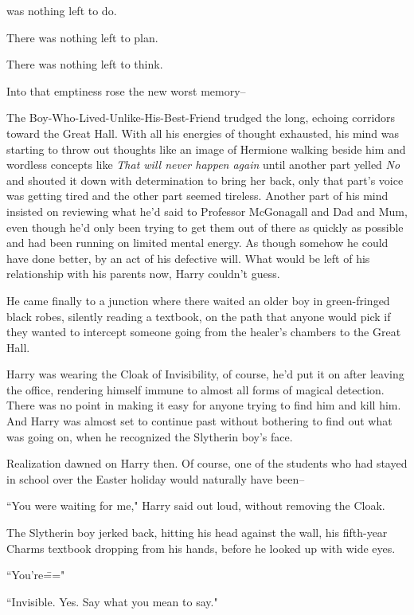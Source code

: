 
 was nothing left to do.

\hplettrineextrapara
There was nothing left to plan.

There was nothing left to think.

Into that emptiness rose the new worst memory\---

The Boy-Who-Lived-Unlike-His-Best-Friend trudged the long, echoing corridors toward the Great Hall. With all his energies of thought exhausted, his mind was starting to throw out thoughts like an image of Hermione walking beside him and wordless concepts like \emph{That will never happen again} until another part yelled \emph{No} and shouted it down with determination to bring her back, only that part's voice was getting tired and the other part seemed tireless. Another part of his mind insisted on reviewing what he'd said to Professor McGonagall and Dad and Mum, even though he'd only been trying to get them out of there as quickly as possible and had been running on limited mental energy. As though somehow he could have done better, by an act of his defective will. What would be left of his relationship with his parents now, Harry couldn't guess.

He came finally to a junction where there waited an older boy in green-fringed black robes, silently reading a textbook, on the path that anyone would pick if they wanted to intercept someone going from the healer's chambers to the Great Hall.

Harry was wearing the Cloak of Invisibility, of course, he'd put it on after leaving the office, rendering himself immune to almost all forms of magical detection. There was no point in making it easy for anyone trying to find him and kill him. And Harry was almost set to continue past without bothering to find out what was going on, when he recognized the Slytherin boy's face.

Realization dawned on Harry then. Of course, one of the students who had stayed in school over the Easter holiday would naturally have been\---

``You were waiting for me," Harry said out loud, without removing the Cloak.

The Slytherin boy jerked back, hitting his head against the wall, his fifth-year Charms textbook dropping from his hands, before he looked up with wide eyes.

``You're\==="

``Invisible. Yes. Say what you mean to say."

